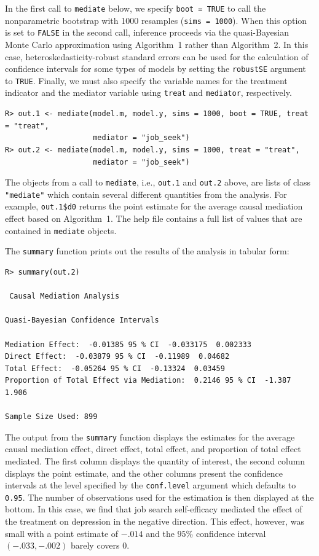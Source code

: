 \documentclass[11pt,letterpaper]{article}
\theoremstyle{plain}
\begin{document}
In the first call to \texttt{mediate} below, we specify \texttt{boot
  = TRUE} to call the nonparametric bootstrap with 1000 resamples
({\tt sims = 1000}). When this option is set to {\tt FALSE} in the second
call, inference proceeds via the quasi-Bayesian Monte Carlo
approximation using Algorithm~1 rather than Algorithm~2.  In this case,
heteroskedasticity-robust standard errors can be used for the calculation of
confidence intervals for some types of models by setting the {\tt robustSE}
argument to {\tt TRUE}.  Finally, we must also
specify the variable names for the treatment indicator and the
mediator variable using {\tt treat} and {\tt mediator}, respectively.
\begin{verbatim}
R> out.1 <- mediate(model.m, model.y, sims = 1000, boot = TRUE, treat = "treat",
                    mediator = "job_seek")
R> out.2 <- mediate(model.m, model.y, sims = 1000, treat = "treat",
                    mediator = "job_seek")
\end{verbatim}
The objects from a call to \texttt{mediate}, i.e., {\tt out.1} and
{\tt out.2} above, are lists of class {\tt "mediate"} which contain several different
quantities from the analysis.  For example, \texttt{out.1\$d0} returns
the point estimate for the average causal mediation effect based on
Algorithm~1.  The help file contains a full list of values that are
contained in \texttt{mediate} objects. 

The \texttt{summary}
function prints out the results of the analysis in tabular form:
\begin{verbatim}
R> summary(out.2)

 Causal Mediation Analysis 

Quasi-Bayesian Confidence Intervals

Mediation Effect:  -0.01385 95 % CI  -0.033175  0.002333 
Direct Effect:  -0.03879 95 % CI  -0.11989  0.04682 
Total Effect:  -0.05264 95 % CI  -0.13324  0.03459 
Proportion of Total Effect via Mediation:  0.2146 95 % CI  -1.387  1.906 

Sample Size Used: 899 
\end{verbatim}
The output from the {\tt summary} function displays the estimates
for the average causal mediation effect, direct effect, total effect,
and proportion of total effect mediated. The first column displays the
quantity of interest, the second column displays the point estimate,
and the other columns present the confidence intervals at the level
specified by the {\tt conf.level} argument which defaults to {\tt 0.95}.
The number of observations used for the estimation is then displayed at
the bottom.  In this case, we
find that job search self-efficacy mediated the effect of the
treatment on depression in the negative direction. This effect,
however, was small with a point estimate of $-.014$ and the $95\%$
confidence interval $(-.033,-.002)$ barely covers $0$.
\end{document}
